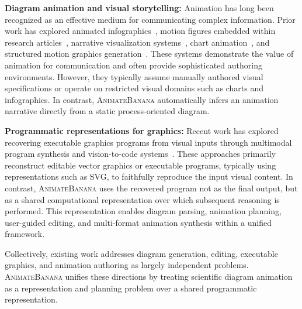 \documentclass{article} %
\begin{document}
\noindent\textbf{Diagram animation and visual storytelling:} Animation has long been recognized as an effective medium for communicating complex information. Prior work has explored animated infographics~\cite{infomotion}, motion figures embedded within research articles~\cite{yourpaperisdead,bringingresearcharticles,motionfigures}, narrative visualization systems~\cite{dataplaywright,narrativevissurvey}, chart animation~\cite{livecharts}, and structured motion graphics generation~\cite{motiongraphicsplan}. These systems demonstrate the value of animation for communication and often provide sophisticated authoring environments. However, they typically assume manually authored visual specifications or operate on restricted visual domains such as charts and infographics. In contrast, \textsc{AnimateBanana} automatically infers an animation narrative directly from a static process-oriented diagram.

\noindent\textbf{Programmatic representations for graphics:} Recent work has explored recovering executable graphics programs from visual inputs through multimodal program synthesis and vision-to-code systems~\cite{beyondnl2code,livesvg}. These approaches primarily reconstruct editable vector graphics or executable programs, typically using representations such as SVG, to faithfully reproduce the input visual content. In contrast, \textsc{AnimateBanana} uses the recovered program not as the final output, but as a shared computational representation over which subsequent reasoning is performed. This representation enables diagram parsing, animation planning, user-guided editing, and multi-format animation synthesis within a unified framework.

Collectively, existing work addresses diagram generation, editing, executable graphics, and animation authoring as largely independent problems. \textsc{AnimateBanana} unifies these directions by treating scientific diagram animation as a representation and planning problem over a shared programmatic representation.


\end{document}
